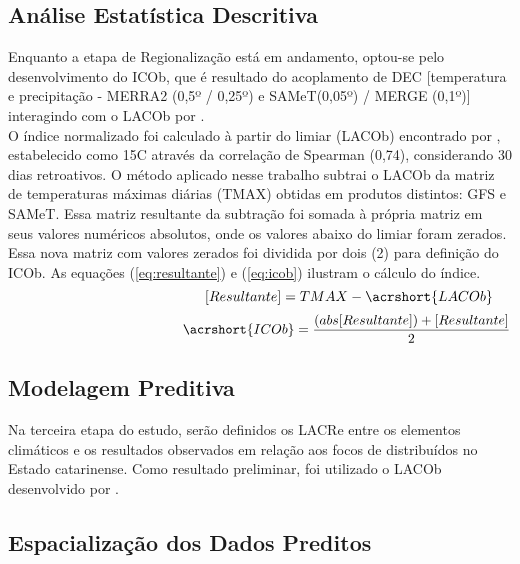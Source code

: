 \subsection{Análise Estatística Descritiva}

\indent Enquanto a etapa de Regionalização está em andamento, optou-se pelo desenvolvimento do \acrfull{ICOb}, que é resultado do acoplamento de \acrshort{DEC} [temperatura e precipitação - MERRA2 (0,5º / 0,25º) e SAMeT(0,05º) / MERGE (0,1º)]  interagindo com o \acrfull{LACOb} por .\\
\indent O índice normalizado foi calculado à partir do limiar (\acrshort{LACOb}) encontrado por , estabelecido como 15C através da correlação de Spearman (0,74), considerando 30 dias retroativos. O método aplicado nesse trabalho subtrai o \acrshort{LACOb} da matriz de temperaturas máximas diárias (TMAX) obtidas em produtos distintos: \acrshort{GFS} e \acrshort{SAMeT}. Essa matriz resultante da subtração foi somada à própria matriz em seus valores numéricos absolutos, onde os valores abaixo do limiar foram zerados. Essa nova matriz com valores zerados foi dividida por dois (2) para definição do \acrfull{ICOb}. As equações (\ref{eq:resultante}) e (\ref{eq:icob}) ilustram o cálculo do índice.
\begin{equation}
\hspace{4,5cm} [Resultante] = TMAX - \acrshort{LACOb}
    \label{eq:resultante}
\end{equation}
\begin{equation}
\hspace{4.5cm} \acrshort{ICOb} = \frac{(abs[Resultante])+[Resultante]}{2}
    \label{eq:icob}
\end{equation}

\subsection{Modelagem Preditiva}

\indent Na terceira etapa do estudo, serão definidos os  \acrfull{LACRe} entre os elementos climáticos e os resultados observados em relação aos focos de  distribuídos no Estado catarinense. Como resultado preliminar, foi utilizado o \acrshort{LACOb} desenvolvido por .


\subsection{Espacialização dos Dados Preditos}

